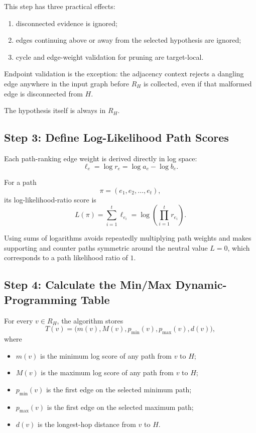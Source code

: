 \documentclass[11pt]{article}
\begin{document}
This step has three practical effects:

\begin{enumerate}
    \item disconnected evidence is ignored;
    \item edges continuing above or away from the selected hypothesis are
          ignored;
    \item cycle and edge-weight validation for pruning are target-local.
\end{enumerate}

Endpoint validation is the exception: the adjacency context rejects a
dangling edge anywhere in the input graph before \(R_H\) is collected, even
if that malformed edge is disconnected from \(H\).

The hypothesis itself is always in \(R_H\).

\subsection{Step 3: Define Log-Likelihood Path Scores}

Each path-ranking edge weight is derived directly in log space:
\[
    \ell_e = \log r_e = \log a_e-\log b_e.
\]

For a path
\[
    \pi=(e_1,e_2,\ldots,e_t),
\]
its log-likelihood-ratio score is
\[
    L(\pi)
      = \sum_{i=1}^{t}\ell_{e_i}
      = \log\left(\prod_{i=1}^{t}r_{e_i}\right).
\]

Using sums of logarithms avoids repeatedly multiplying path weights and makes
supporting and counter paths symmetric around the neutral value
\(L=0\), which corresponds to a path likelihood ratio of \(1\).

\subsection{Step 4: Calculate the Min/Max Dynamic-Programming Table}

For every \(v\in R_H\), the algorithm stores
\[
    T(v)=
    \bigl(m(v),M(v),p_{\min}(v),p_{\max}(v),d(v)\bigr),
\]
where

\begin{itemize}
    \item \(m(v)\) is the minimum log score of any path from \(v\) to \(H\);
    \item \(M(v)\) is the maximum log score of any path from \(v\) to \(H\);
    \item \(p_{\min}(v)\) is the first edge on the selected minimum path;
    \item \(p_{\max}(v)\) is the first edge on the selected maximum path;
    \item \(d(v)\) is the longest-hop distance from \(v\) to \(H\).
\end{itemize}
\end{document}
